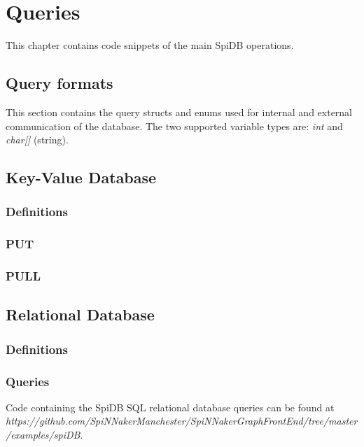 \chapter{Queries}

This chapter contains code snippets of the main SpiDB operations.

\section{Query formats}
\label{sec:appendix-queries}
This section contains the query structs and enums used for internal and external communication of the database. The two supported variable types are: \textit{int} and \textit{char[]} (string).



\section{Key-Value Database}
\subsection{Definitions}


\subsection{PUT}


\subsection{PULL}


\section{Relational Database}
\subsection{Definitions}


\subsection{Queries}
Code containing the SpiDB SQL relational database queries can be found at \\
\textit{https://github.com/SpiNNakerManchester/SpiNNakerGraphFrontEnd/tree/master/examples/spiDB}.